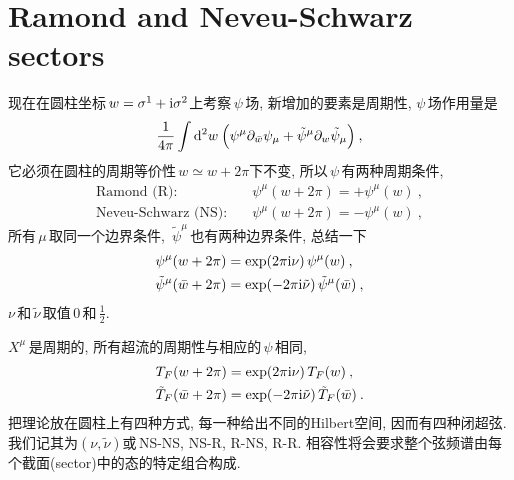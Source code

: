 \section{Ramond and Neveu-Schwarz sectors}
现在在圆柱坐标$\,w=\sigma^{1}+\mathrm{i}\sigma^{2}$上考察$\,\psi\,$场, 新增加的要素是周期性, $\psi\,$场作用量是
\begin{equation}
    \frac{1}{4\pi}\int \mathrm{d}^{2} w\: \Bigl(\psi^{\mu}\partial_{\bar{w}}\psi_{\mu}
    +\tilde{\psi}^{\mu}\partial_{w}\tilde{\psi}_{\mu} \Bigr) \:, \label{10.2.1}
\end{equation}
它必须在圆柱的周期等价性$\,w\simeq w+2\pi$下不变, 所以$\,\psi\,$有两种周期条件,
\begin{subequations}
\begin{align}
    \text{Ramond (R)}:&\quad \psi^{\mu}(w+2\pi)= +\psi^{\mu}(w) \:, \label{10.2.2a} \\
    \text{Neveu-Schwarz (NS)}:&\quad \psi^{\mu}(w+2\pi)=-\psi^{\mu}(w) \:, \label{10.2.2b}
\end{align}    
\end{subequations}
所有$\,\mu\,$取同一个边界条件, $\,\tilde{\psi}^{\mu}\,$也有两种边界条件, 总结一下
\begin{subequations}
\begin{align}
    \psi^{\mu}(w+2\pi) &= \exp(2\pi\mathrm{i}\nu)\, \psi^{\mu}(w) \:, \label{10.2.3a} \\
    \tilde{\psi}^{\mu}(\bar{w}+2\pi)&= \exp(-2\pi\mathrm{i}\tilde{\nu})\,\tilde{\psi}^{\mu}(\bar{w}) \:, \label{10.2.3b} 
\end{align}
\end{subequations}
$\nu\,$和$\,\tilde{\nu}\,$取值$\,0\,$和$\,\frac{1}{2}$.

$X^{\mu}\,$是周期的, 所有超流的周期性与相应的$\,\psi\,$相同,
\begin{subequations}
\begin{align}
    T_{F}(w+2\pi) &= \exp(2\pi\mathrm{i}\nu)\,T_{F}(w) \:, \label{10.2.4a}\\
    \tilde{T}_{F}(\bar{w}+2\pi) &= \exp(-2\pi\mathrm{i}\tilde{\nu})\,\tilde{T}_{F}(\bar{w})\:. \label{10.2.4b}
\end{align}  \label{10.2.4}
\end{subequations}
把理论放在圆柱上有四种方式, 每一种给出不同的Hilbert空间, 因而有四种闭超弦. 我们记其为$(\nu,\tilde{\nu})$或\,NS-NS, NS-R, R-NS, R-R. 相容性将会要求整个弦频谱由每个截面(sector)中的态的特定组合构成.

